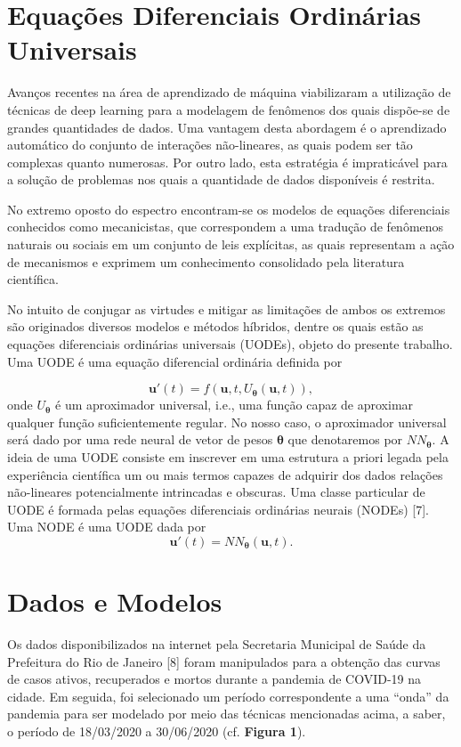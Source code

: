\documentclass[a4paper,12pt]{article}
\begin{document}
\section{Equações Diferenciais Ordinárias Universais}

Avanços recentes na área de aprendizado de máquina viabilizaram a utilização de técnicas de deep learning para a modelagem de fenômenos dos quais dispõe-se de grandes quantidades de dados. Uma vantagem desta abordagem é o aprendizado automático do conjunto de interações não-lineares, as quais podem ser
tão complexas quanto numerosas. Por outro lado, esta estratégia é impraticável para a solução de problemas nos quais a quantidade de dados disponíveis é restrita.

No extremo oposto do espectro encontram-se os modelos de equações diferenciais conhecidos como mecanicistas, que correspondem a uma tradução de fenômenos naturais ou sociais em um conjunto de leis explícitas, as quais representam a ação de mecanismos e exprimem um conhecimento consolidado pela literatura científica.

No intuito de conjugar as virtudes e mitigar as limitações de ambos os extremos são originados diversos modelos e métodos híbridos, dentre os quais estão as equações diferenciais ordinárias universais (UODEs), objeto do presente trabalho. Uma UODE é uma equação diferencial ordinária definida por

$$ \mathbf{u}'(t) = f(\mathbf{u}, t, U_{\boldsymbol{\theta}}(\mathbf{u},t)), $$
onde $U_{\boldsymbol{\theta}}$ é um aproximador universal, i.e., uma função capaz de aproximar qualquer função suficientemente regular. No nosso caso, o aproximador universal será dado por uma rede neural de vetor de pesos $\boldsymbol{\theta}$ que denotaremos por $N\!N_{\boldsymbol{\theta}}$. A ideia de uma UODE consiste em inscrever em uma estrutura a priori legada pela experiência científica um ou mais termos capazes de adquirir dos dados relações não-lineares potencialmente intrincadas e obscuras. Uma classe particular de UODE é formada pelas equações diferenciais ordinárias neurais (NODEs) [7]. Uma NODE é uma UODE dada por
$$ \mathbf{u}'(t) = N\!N_{\boldsymbol{\theta}}(\mathbf{u}, t). $$

\section{Dados e Modelos}

Os dados disponibilizados na internet pela Secretaria Municipal de Saúde da Prefeitura do Rio de Janeiro [8] foram manipulados para a obtenção das curvas de casos ativos, recuperados e mortos durante a pandemia de COVID-19 na cidade. Em seguida, foi selecionado um período correspondente a uma “onda” da pandemia para ser modelado por meio das técnicas mencionadas acima, a saber, o período de 18/03/2020 a 30/06/2020 (cf. \textbf{Figura 1}).
\vspace{0.05in}
\end{document}
